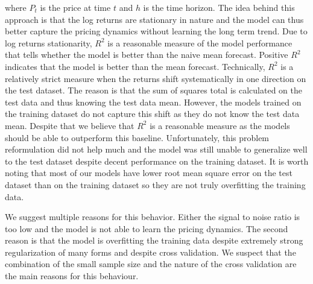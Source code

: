 where $P_t$ is the price at time $t$ and $h$ is the time horizon.
The idea behind this approach is that the log returns are stationary in nature
and the model can thus better capture
the pricing dynamics without learning the long term trend.
Due to log returns stationarity, 
$R^2$ is a reasonable measure of the model performance that
tells whether the model is better than the naive mean forecast.
Positive $R^2$ indicates that the model is better than the mean forecast.
Technically, $R^2$ is a relatively strict measure
when the returns shift systematically in one direction on the test dataset.
The reason is that the sum of squares total
is calculated on the test data and thus knowing the test data mean.
However, the models trained on the training dataset do not 
capture this shift as they do not know the test data mean.
Despite that we believe that $R^2$ is a reasonable measure
as the models should be able to outperform this baseline.
Unfortunately, this problem reformulation 
did not help much and the model was still
unable to generalize well to the test dataset despite
decent performance on the training dataset.
It is worth noting that most of our
models have lower root mean square error on the test
dataset than on the training dataset so they 
are not truly overfitting the training data.



We suggest multiple reasons for this behavior. 
Either the signal to noise ratio is too low
and the model is not able 
to learn the pricing dynamics. 
The second reason is that the model is overfitting the training
data despite extremely strong regularization of many forms and despite
cross validation. We suspect
that the combination of the small sample size and the
nature of the cross validation 
are the main reasons for this behaviour. 

